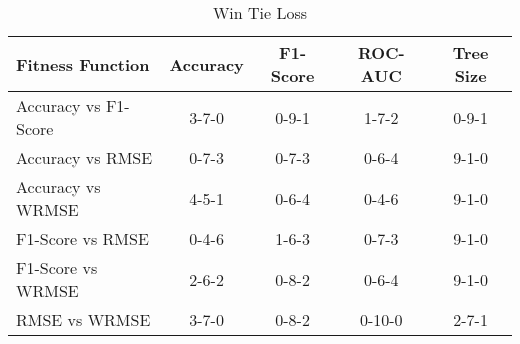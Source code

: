 
    \begin{table}[H]
        \centering
        \renewcommand{\arraystretch}{1.2}
        \caption{Win Tie Loss}
        \label{tab:fitness_wtl}
    \begin{tabular}{lcccc}
\toprule
Fitness Function & Accuracy & F1-Score & ROC-AUC & Tree Size \\
\midrule
Accuracy vs F1-Score & 3-7-0 & 0-9-1 & 1-7-2 & 0-9-1 \\
Accuracy vs RMSE & 0-7-3 & 0-7-3 & 0-6-4 & 9-1-0 \\
Accuracy vs WRMSE & 4-5-1 & 0-6-4 & 0-4-6 & 9-1-0 \\
F1-Score vs RMSE & 0-4-6 & 1-6-3 & 0-7-3 & 9-1-0 \\
F1-Score vs WRMSE & 2-6-2 & 0-8-2 & 0-6-4 & 9-1-0 \\
RMSE vs WRMSE & 3-7-0 & 0-8-2 & 0-10-0 & 2-7-1 \\
\bottomrule
\end{tabular}

        
    \end{table}
    